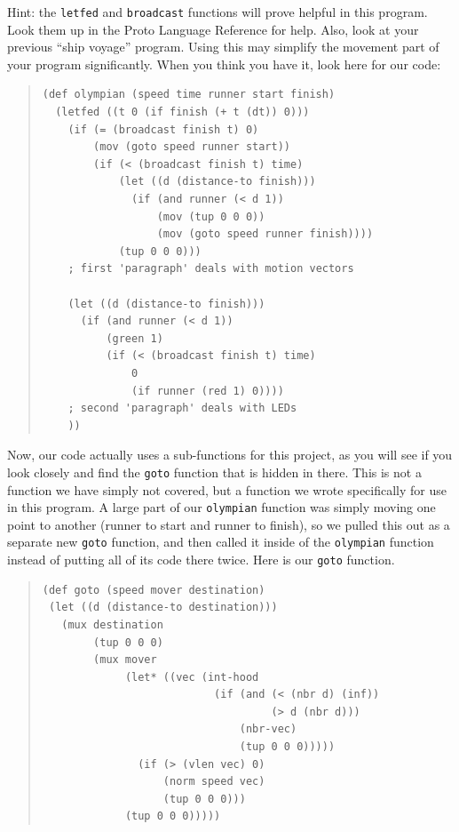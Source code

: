 \documentclass{article}
\newcommand\var[1]{{\tt #1}}
\begin{document}
Hint: the \var{letfed} and \var{broadcast} functions will prove
helpful in this program.  Look them up in the Proto Language Reference
for help.  Also, look at your previous ``ship voyage'' program.  Using
this may simplify the movement part of your program significantly.
When you think you have it, look here for our code:

\begin{quote}
\begin{verbatim}
(def olympian (speed time runner start finish) 
  (letfed ((t 0 (if finish (+ t (dt)) 0))) 
    (if (= (broadcast finish t) 0) 
        (mov (goto speed runner start)) 
        (if (< (broadcast finish t) time) 
            (let ((d (distance-to finish))) 
              (if (and runner (< d 1)) 
                  (mov (tup 0 0 0)) 
                  (mov (goto speed runner finish))))
            (tup 0 0 0)))
    ; first 'paragraph' deals with motion vectors

    (let ((d (distance-to finish))) 
      (if (and runner (< d 1)) 
          (green 1) 
          (if (< (broadcast finish t) time) 
              0
              (if runner (red 1) 0))))
    ; second 'paragraph' deals with LEDs
    ))
\end{verbatim}
\end{quote}

Now, our code actually uses a sub-functions for this project, as you
will see if you look closely and find the \var{goto} function that is
hidden in there.  This is not a function we have simply not covered,
but a function we wrote specifically for use in this program.  A large
part of our \var{olympian} function was simply moving one point to
another (runner to start and runner to finish), so we pulled this out
as a separate new \var{goto} function, and then called it inside of
the \var{olympian} function instead of putting all of its code there
twice.  Here is our \var{goto} function.

\begin{quote}
\begin{verbatim}
(def goto (speed mover destination)
 (let ((d (distance-to destination)))
   (mux destination
        (tup 0 0 0)
        (mux mover
             (let* ((vec (int-hood 
                           (if (and (< (nbr d) (inf)) 
                                    (> d (nbr d)))
                               (nbr-vec)
                               (tup 0 0 0)))))
               (if (> (vlen vec) 0) 
                   (norm speed vec)
                   (tup 0 0 0)))
             (tup 0 0 0)))))
\end{verbatim}
\end{quote}
\end{document}
